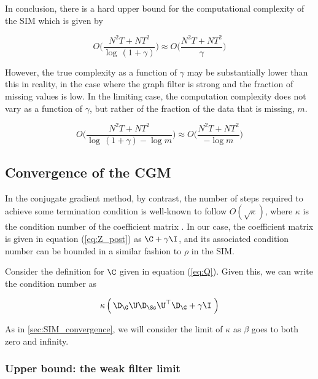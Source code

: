 In conclusion, there is a hard upper bound for the computational complexity of the SIM which is given by


\begin{equation}
    \label{eq:OSIM}
    O\Bigg(\frac{N^2T + NT^2}{\log\,(1 + \gamma)} \Bigg) \approx O\Bigg(\frac{N^2T + NT^2}{\gamma} \Bigg)
\end{equation}


However, the true complexity as a function of $\gamma$ may be substantially lower than this in reality, in the case where the graph filter is strong and the fraction of missing values is low. In the limiting case, the computation complexity does not vary as a function of $\gamma$, but rather of the fraction of the data that is missing, $m$. 


\begin{equation}
    \label{eq:OSIM2}
    O\Bigg(\frac{N^2T + NT^2}{\log\,(1 + \gamma) - \log m} \Bigg) \approx O\Bigg(\frac{N^2T + NT^2}{- \log m} \Bigg)
\end{equation}

\subsection{Convergence of the CGM}
\label{sec:CGM_convergence}

In the conjugate gradient method, by contrast, the number of steps required to achieve some termination condition is well-known to follow $O(\sqrt{\kappa})$, where $\kappa$ is the condition number of the coefficient matrix \cite{Kelley1995}. In our case, the coefficient matrix is given in equation (\ref{eq:Z_post}) as $\C + \gamma \I$, and its associated condition number can be bounded in a similar fashion to $\rho$ in the SIM.

Consider the definition for $\C$ given in equation (\ref{eq:Q}). Given this, we can write the condition number as 

\begin{equation}
     \kappa \left(  \, \D_\G \U \D_{\Ss} \U^\top \D_\G + \gamma \I \; \right)
\end{equation}

As in \cref{sec:SIM_convergence}, we will consider the limit of $\kappa$ as $\beta$ goes to both zero and infinity.  

\subsubsection{Upper bound: the weak filter limit}


